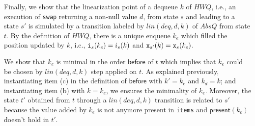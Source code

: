 Finally, we show that the linearization point of a dequeue $k$ of $\mathit{HWQ}$, i.e., an execution of {\tt swap} returning a non-null value $d$, from state $s$ and leading to a state $s'$ is simulated by a transition labeled by $lin(deq,d,k)$ of $AbsQ$ from state $t$. By the definition of $\mathit{HWQ}$, there is a unique enqueue $k_e$ which filled the position updated by $k$, i.e., ${\tt i}_s(k_e)=i_s(k)$ and ${\tt x}_{s'}(k)={\tt x}_s(k_e)$. 

We show that $k_e$ is minimal in the order $\mathsf{before}$ of $t$ which implies that $k_e$ could be chosen by $lin(deq,d,k)$ step applied on $t$. As explained previously, instantiating item (c) in the definition of $\mathsf{before}$ with $k'=k_e$ and $k_d=k$; and instantiating item (b) with $k=k_e$, we ensures the minimality of $k_e$. Moreover, the state $t'$ obtained from $t$ through a $lin(deq,d,k)$ transition is related to $s'$ because the value added by $k_e$ is not anymore present in {\tt items} and $\mathsf{present}(k_e)$ doesn't hold in $t'$.
%
%